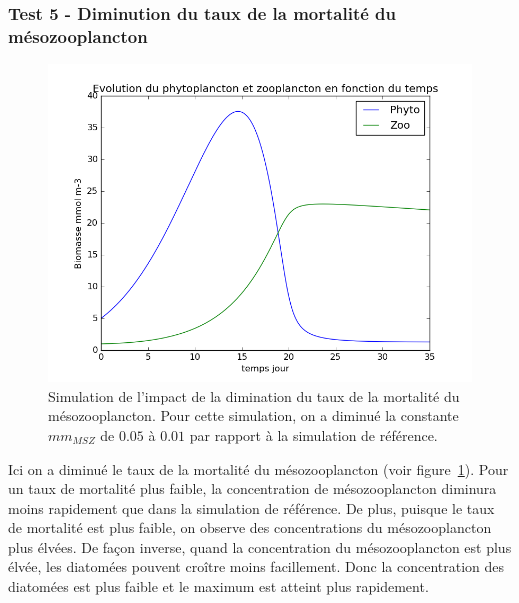 {\subsubsection{Test 5 - Diminution du taux de la mortalité du mésozooplancton}
\begin{figure}[h!]
  \includegraphics[width=\textwidth]{partie1/test5x35.png}
  \caption{Simulation de l'impact de la dimination du taux de la mortalité du mésozooplancton. Pour
cette simulation, on a diminué la constante $mm_{MSZ}$ de $0.05$ à $0.01$ par rapport à la simulation de
référence.}
  \label{fig:partie1t5}
\end{figure}
\par{
Ici on a diminué le taux de la mortalité du mésozooplancton (voir figure~\ref{fig:partie1t5}).
Pour un taux de mortalité plus faible, la concentration de mésozooplancton diminura moins rapidement que
dans la simulation de référence. De plus, puisque le taux de mortalité est plus faible, on observe des
concentrations du mésozooplancton plus élvées. De façon inverse, quand la concentration du mésozooplancton
est plus élvée, les diatomées pouvent croître moins facillement. Donc la concentration des diatomées est
plus faible et le maximum est atteint plus rapidement.
}
\FloatBarrier

}
